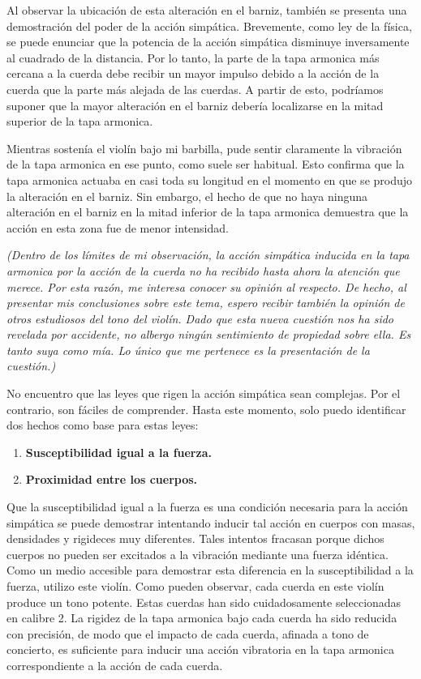\documentclass[12pt]{book}
\begin{document}
Al observar la ubicación de esta alteración en el barniz, también se presenta una demostración del poder de la acción simpática. Brevemente, como ley de la física, se puede enunciar que la potencia de la acción simpática disminuye inversamente al cuadrado de la distancia. Por lo tanto, la parte de la tapa armonica más cercana a la cuerda debe recibir un mayor impulso debido a la acción de la cuerda que la parte más alejada de las cuerdas. A partir de esto, podríamos suponer que la mayor alteración en el barniz debería localizarse en la mitad superior de la tapa armonica.

Mientras sostenía el violín bajo mi barbilla, pude sentir claramente la vibración de la tapa armonica en ese punto, como suele ser habitual. Esto confirma que la tapa armonica actuaba en casi toda su longitud en el momento en que se produjo la alteración en el barniz. Sin embargo, el hecho de que no haya ninguna alteración en el barniz en la mitad inferior de la tapa armonica demuestra que la acción en esta zona fue de menor intensidad.

\textit{(Dentro de los límites de mi observación, la acción simpática inducida en la tapa armonica por la acción de la cuerda no ha recibido hasta ahora la atención que merece. Por esta razón, me interesa conocer su opinión al respecto. De hecho, al presentar mis conclusiones sobre este tema, espero recibir también la opinión de otros estudiosos del tono del violín. Dado que esta nueva cuestión nos ha sido revelada por accidente, no albergo ningún sentimiento de propiedad sobre ella. Es tanto suya como mía. Lo único que me pertenece es la presentación de la cuestión.)}

No encuentro que las leyes que rigen la acción simpática sean complejas. Por el contrario, son fáciles de comprender. Hasta este momento, solo puedo identificar dos hechos como base para estas leyes:

\begin{enumerate}
    \item \textbf{Susceptibilidad igual a la fuerza.}
    \item \textbf{Proximidad entre los cuerpos.}
\end{enumerate}

Que la susceptibilidad igual a la fuerza es una condición necesaria para la acción simpática se puede demostrar intentando inducir tal acción en cuerpos con masas, densidades y rigideces muy diferentes. Tales intentos fracasan porque dichos cuerpos no pueden ser excitados a la vibración mediante una fuerza idéntica. Como un medio accesible para demostrar esta diferencia en la susceptibilidad a la fuerza, utilizo este violín. Como pueden observar, cada cuerda en este violín produce un tono potente. Estas cuerdas han sido cuidadosamente seleccionadas en calibre 2. La rigidez de la tapa armonica bajo cada cuerda ha sido reducida con precisión, de modo que el impacto de cada cuerda, afinada a tono de concierto, es suficiente para inducir una acción vibratoria en la tapa armonica correspondiente a la acción de cada cuerda.
\end{document}
